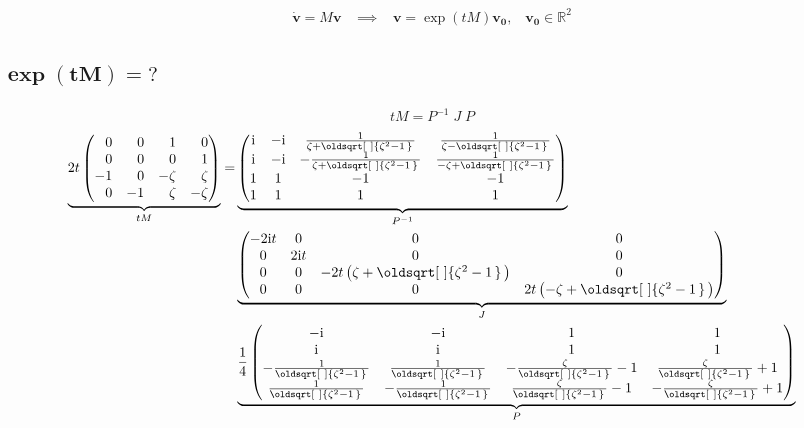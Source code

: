 \documentclass[10pt,a4paper]{article}
\renewcommand*{\sqrt}[2][\ ]{\oldsqrt[#1]{#2\,}\,}
\def\ph{\phantom}
\newcommand{\const}[1]{\text{\rmfamily\upshape #1}}
\newcommand{\mat}[1]{
    \begin{pmatrix}
        #1
    \end{pmatrix}
}
\renewcommand{\i}{\const{i}}
\begin{document}
\begin{align*}
    \boxed{
        \dot{\bm{v}} = M \bm{v} \;\;\;
        \implies \;\;\;
        \bm{v} = \exp(t M) \bm{v_0}, \;\;\;
        \bm{v_0} \in \mathbb{R}^2
    }
\end{align*}


\subsection{
    \texorpdfstring{
        $\pmb{ \exp(tM) = \mathit{?} }$
    }{
        exp(tM) = ?
    }
}
\begin{gather*}
    tM = P^{-1} \; J \; P
\end{gather*}
\begin{align*}
    \underbrace{
        2t
        \mat{
            \ph{-}0 & \ph{-}0 & \ph{-}1 & \ph{-}0 \\
            \ph{-}0 & \ph{-}0 & \ph{-}0 & \ph{-}1 \\
            -1      & \ph{-}0 & -\zeta  & \ph{-}\zeta \\
            \ph{-}0 & -1      & \ph{-}\zeta & -\zeta
        }
    }_{
        tM
    }
    =
    &\underbrace{
        \mat{\i & - \i & \frac{1}{\zeta + \sqrt{\zeta^{2} - 1}} & \frac{1}{\zeta - \sqrt{\zeta^{2} - 1}}\\\i & - \i & - \frac{1}{\zeta + \sqrt{\zeta^{2} - 1}} & \frac{1}{- \zeta + \sqrt{\zeta^{2} - 1}}\\1 & 1 & -1 & -1\\1 & 1 & 1 & 1}
    }_{
        P^{-1}
    }
    \\
    &\underbrace{
        \mat{- 2 \i t & 0 & 0 & 0\\0 & 2 \i t & 0 & 0\\0 & 0 & - 2 t \left(\zeta + \sqrt{\zeta^{2} - 1}\right) & 0\\0 & 0 & 0 & 2 t \left(- \zeta + \sqrt{\zeta^{2} - 1}\right)}
    }_{
        J
    }
    \\
    &\underbrace{
        \frac{1}{4}
        \mat{- \i & - \i & 1 & 1\\\i & \i & 1 & 1\\- \frac{1}{\sqrt{\zeta^{2} - 1}} & \frac{1}{\sqrt{\zeta^{2} - 1}} & - \frac{\zeta}{\sqrt{\zeta^{2} - 1}} - 1 & \frac{\zeta}{\sqrt{\zeta^{2} - 1}} + 1\\\frac{1}{\sqrt{\zeta^{2} - 1}} & - \frac{1}{\sqrt{\zeta^{2} - 1}} & \frac{\zeta}{\sqrt{\zeta^{2} - 1}} - 1 & - \frac{\zeta}{\sqrt{\zeta^{2} - 1}} + 1}
    }_{
        P
    }
\end{align*}
\end{document}
